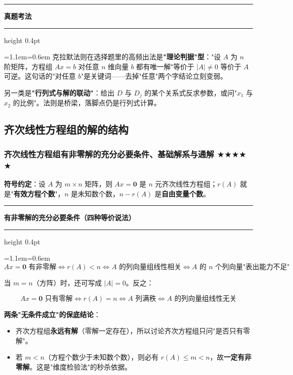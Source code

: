 \documentclass[11pt,openany,UTF8]{ctexbook}
\newcommand{\callouthead}[2]{%
  \par\addvspace{7pt}\noindent
  {\color{#1}\rule[-0.15em]{3pt}{1.05em}}\hspace{0.5em}%
  {\bfseries\color{#1}#2}\par\nobreak\vspace{-0.35em}%
  {\color{rulesep}\hrule height 0.4pt}\nobreak\vspace{0.45em}%
  \begingroup\small\setlength{\parindent}{0pt}%
  \leftskip=1.1em\rightskip=0.6em\noindent\ignorespaces}
\newcommand{\calloutend}{\par\endgroup\addvspace{7pt}}
\newenvironment{callkey}[1]{\callouthead{keybar}{#1}}{\calloutend}
\newenvironment{callexam}[1]{\callouthead{exambar}{#1}}{\calloutend}
\begin{document}
\begin{callexam}{真题考法}
克拉默法则在选择题里的高频出法是\textbf{"理论判据"型}："设 $A$ 为 $n$ 阶矩阵，方程组 $Ax=b$ 对任意 $n$ 维向量 $b$ 都有唯一解"等价于 $\vert A\vert\ne 0$ 等价于 $A$ 可逆。这句话的"对任意 $b$"是关键词——去掉"任意"两个字结论立刻变弱。

另一类是\textbf{"行列式与解的联动"}：给出 $D$ 与 $D_j$ 的某个关系式反求参数，或问"$x_1$ 与 $x_2$ 的比例"。法则是桥梁，落脚点仍是行列式计算。

\end{callexam}

\subsection{齐次线性方程组的解的结构}

\subsubsection{齐次线性方程组有非零解的充分必要条件、基础解系与通解 $\bigstar$$\bigstar$$\bigstar$$\bigstar$$\bigstar$}

\textbf{符号约定}：设 $A$ 为 $m\times n$ 矩阵，则 $Ax=\mathbf{0}$ 是 $n$ 元齐次线性方程组；$r(A)$ 就是"\textbf{有效方程个数}"，$n$ 是未知数个数，$n-r(A)$ 是\textbf{自由变量个数}。

\begin{callkey}{有非零解的充分必要条件（四种等价说法）}
\[Ax=\mathbf{0}\text{ 有非零解}
\iff r(A)<n
\iff A\text{ 的列向量组线性相关}
\iff A\text{ 的 }n\text{ 个列向量"表出能力不足"}\]

当 $m=n$（方阵）时，还可写成 $\vert A\vert=0$。反之：

\[Ax=\mathbf{0}\text{ 只有零解}\iff r(A)=n \iff A\text{ 列满秩}\iff A\text{ 的列向量组线性无关}\]

\textbf{两条"无条件成立"的保底结论}：

\begin{itemize}
\item 齐次方程组\textbf{永远有解}（零解一定存在），所以讨论齐次方程组只问"是否只有零解"。
\item 若 $m<n$（方程个数少于未知数个数），则必有 $r(A)\le m<n$，故\textbf{一定有非零解}。这是"维度检验法"的秒杀依据。
\end{itemize}
\end{callkey}
\end{document}
